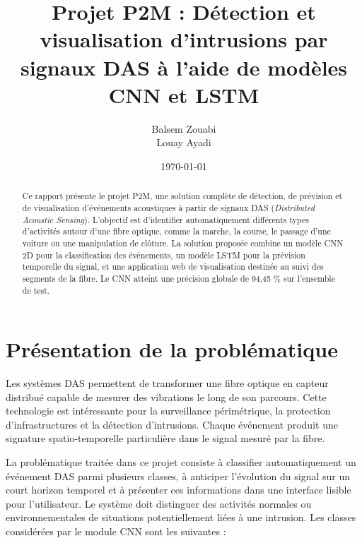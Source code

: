 \documentclass[10pt,a4paper]{article}
\title{\textbf{Projet P2M : Détection et visualisation d'intrusions par signaux DAS à l'aide de modèles CNN et LSTM}}
\author{Balsem Zouabi \\ Louay Ayadi}
\date{\today}
\begin{document}
\maketitle

\begin{abstract}
Ce rapport présente le projet P2M, une solution complète de détection, de prévision et de visualisation d'événements
acoustiques à partir de signaux DAS (\textit{Distributed Acoustic Sensing}). L'objectif est d'identifier
automatiquement différents types d'activités autour d'une fibre optique, comme la marche, la course, le
passage d'une voiture ou une manipulation de clôture. La solution proposée combine un modèle CNN 2D pour
la classification des événements, un modèle LSTM pour la prévision temporelle du signal, et une application
web de visualisation destinée au suivi des segments de la fibre. Le CNN atteint une précision globale de
94,45 \% sur l'ensemble de test.
\end{abstract}

\tableofcontents
\newpage

\section{Présentation de la problématique}

Les systèmes DAS permettent de transformer une fibre optique en capteur distribué capable de mesurer des
vibrations le long de son parcours. Cette technologie est intéressante pour la surveillance périmétrique,
la protection d'infrastructures et la détection d'intrusions. Chaque événement produit une signature
spatio-temporelle particulière dans le signal mesuré par la fibre.

La problématique traitée dans ce projet consiste à classifier automatiquement un événement DAS parmi
plusieurs classes, à anticiper l'évolution du signal sur un court horizon temporel et à présenter ces
informations dans une interface lisible pour l'utilisateur. Le système doit distinguer des activités normales
ou environnementales de situations potentiellement liées à une intrusion. Les classes considérées par le
module CNN sont les suivantes :
\end{document}
